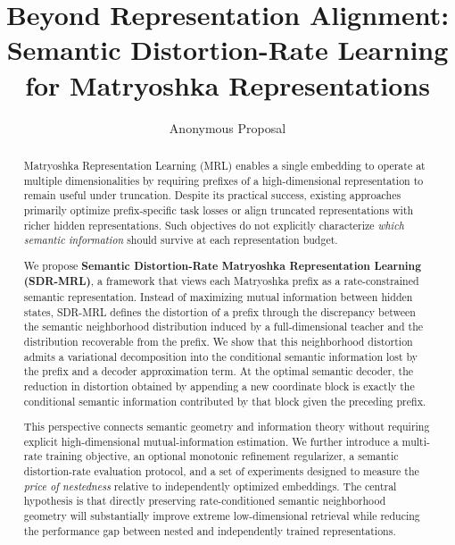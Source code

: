 \documentclass[11pt]{article}
\title{
\textbf{Beyond Representation Alignment:}\\
Semantic Distortion-Rate Learning for Matryoshka Representations
}
\author{
Anonymous Proposal
}
\date{}
\begin{document}
\maketitle


\begin{abstract}
Matryoshka Representation Learning (MRL) enables a single embedding to operate at multiple dimensionalities by requiring prefixes of a high-dimensional representation to remain useful under truncation.
Despite its practical success, existing approaches primarily optimize prefix-specific task losses or align truncated representations with richer hidden representations.
Such objectives do not explicitly characterize \emph{which semantic information} should survive at each representation budget.

We propose \textbf{Semantic Distortion-Rate Matryoshka Representation Learning (SDR-MRL)}, a framework that views each Matryoshka prefix as a rate-constrained semantic representation.
Instead of maximizing mutual information between hidden states, SDR-MRL defines the distortion of a prefix through the discrepancy between the semantic neighborhood distribution induced by a full-dimensional teacher and the distribution recoverable from the prefix.
We show that this neighborhood distortion admits a variational decomposition into the conditional semantic information lost by the prefix and a decoder approximation term.
At the optimal semantic decoder, the reduction in distortion obtained by appending a new coordinate block is exactly the conditional semantic information contributed by that block given the preceding prefix.

This perspective connects semantic geometry and information theory without requiring explicit high-dimensional mutual-information estimation.
We further introduce a multi-rate training objective, an optional monotonic refinement regularizer, a semantic distortion-rate evaluation protocol, and a set of experiments designed to measure the \emph{price of nestedness} relative to independently optimized embeddings.
The central hypothesis is that directly preserving rate-conditioned semantic neighborhood geometry will substantially improve extreme low-dimensional retrieval while reducing the performance gap between nested and independently trained representations.
\end{abstract}
\end{document}
